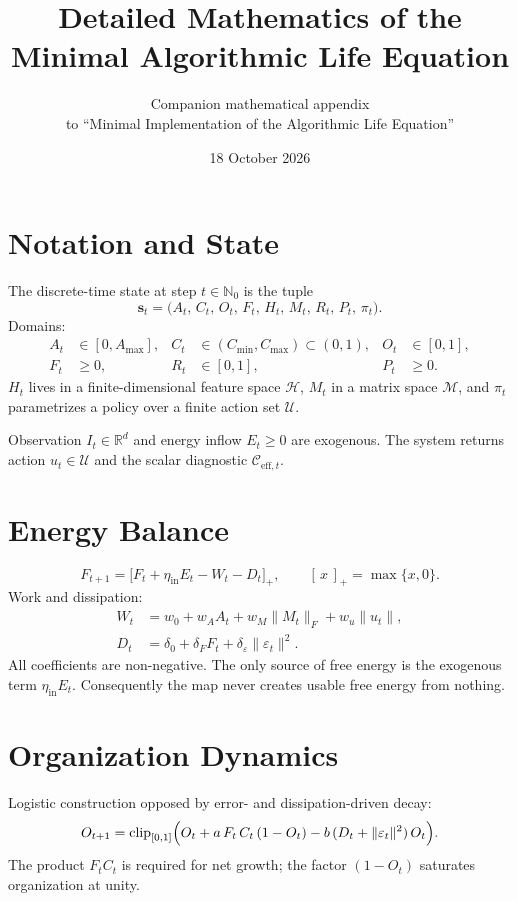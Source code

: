 \documentclass[11pt,a4paper]{article}
\title{\textbf{Detailed Mathematics of the Minimal Algorithmic Life Equation}}
\author{Companion mathematical appendix\\ to ``Minimal Implementation of the Algorithmic Life Equation''}
\date{18 October 2026}
\begin{document}
\maketitle

\section*{Notation and State}

The discrete-time state at step \(t\in\mathbb{N}_0\) is the tuple
\[
\mathbf{s}_t = \bigl(A_t,\,C_t,\,O_t,\,F_t,\,H_t,\,M_t,\,R_t,\,P_t,\,\pi_t\bigr).
\]
Domains:
\begin{align*}
A_t &\in[0,A_{\max}], &
C_t &\in(C_{\min},C_{\max})\subset(0,1), &
O_t &\in[0,1],\\
F_t &\ge 0, &
R_t &\in[0,1], &
P_t &\ge 0.
\end{align*}
\(H_t\) lives in a finite-dimensional feature space \(\mathcal{H}\), \(M_t\) in a matrix space \(\mathcal{M}\), and \(\pi_t\) parametrizes a policy over a finite action set \(\mathcal{U}\).

Observation \(I_t\in\mathbb{R}^d\) and energy inflow \(E_t\ge 0\) are exogenous. The system returns action \(u_t\in\mathcal{U}\) and the scalar diagnostic \(\mathcal{C}_{\mathrm{eff},t}\).

\section{Energy Balance}

\begin{equation}
F_{t+1}=\bigl[F_t+\eta_{\mathrm{in}}E_t-W_t-D_t\bigr]_+,\qquad
[\,x\,]_+=\max\{x,0\}.
\end{equation}
Work and dissipation:
\begin{align}
W_t &= w_0+w_A A_t+w_M\|M_t\|_F+w_u\|u_t\|,\\
D_t &= \delta_0+\delta_F F_t+\delta_{\varepsilon}\|\varepsilon_t\|^2.
\end{align}
All coefficients are non-negative. The only source of free energy is the exogenous term \(\eta_{\mathrm{in}}E_t\). Consequently the map never creates usable free energy from nothing.

\section{Organization Dynamics}

Logistic construction opposed by error- and dissipation-driven decay:
\begin{equation}
O_{t+1}=\operatorname{clip}_{[0,1]}\Bigl(
O_t+a\,F_t\,C_t\,(1-O_t)-b\,(D_t+\|\varepsilon_t\|^2)\,O_t
\Bigr).
\end{equation}
The product \(F_t C_t\) is required for net growth; the factor \((1-O_t)\) saturates organization at unity.
\end{document}
